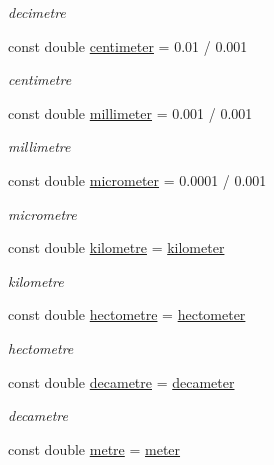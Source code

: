 \begin{DoxyCompactItemize}
\begin{DoxyCompactList}\small\item\em decimetre \end{DoxyCompactList}\item 
const double \hyperlink{namespace_utilities_a17483d8b3688f5a3786b48f4ed70588c}{centimeter} = 0.01 / 0.001
\begin{DoxyCompactList}\small\item\em centimetre \end{DoxyCompactList}\item 
const double \hyperlink{namespace_utilities_ae8c7101098fba61f862817a083c422ca}{millimeter} = 0.001 / 0.001
\begin{DoxyCompactList}\small\item\em millimetre \end{DoxyCompactList}\item 
const double \hyperlink{namespace_utilities_a99dfe40c94af0523293210aaf01a0435}{micrometer} = 0.0001 / 0.001
\begin{DoxyCompactList}\small\item\em micrometre \end{DoxyCompactList}\item 
const double \hyperlink{namespace_utilities_ae059df9243c641262f7a72694479ab09}{kilometre} = \hyperlink{namespace_utilities_a06654149ce3cba96084c785b079a7a31}{kilometer}
\begin{DoxyCompactList}\small\item\em kilometre \end{DoxyCompactList}\item 
const double \hyperlink{namespace_utilities_ac838a64f1022b1f9cb88f0f641ee26b1}{hectometre} = \hyperlink{namespace_utilities_a3fb2d462bd1e7dc8fe4dbc1ad4f28ff3}{hectometer}
\begin{DoxyCompactList}\small\item\em hectometre \end{DoxyCompactList}\item 
const double \hyperlink{namespace_utilities_ae6f96b1086168f4287845866c4a8a546}{decametre} = \hyperlink{namespace_utilities_a66e92dbad293594bf063d31aa9305983}{decameter}
\begin{DoxyCompactList}\small\item\em decametre \end{DoxyCompactList}\item 
const double \hyperlink{namespace_utilities_abf8ec967be8032f9546e417808f17cec}{metre} = \hyperlink{namespace_utilities_a2b626049c35729f994e12d5f4f950d6b}{meter}

\end{DoxyCompactItemize}
